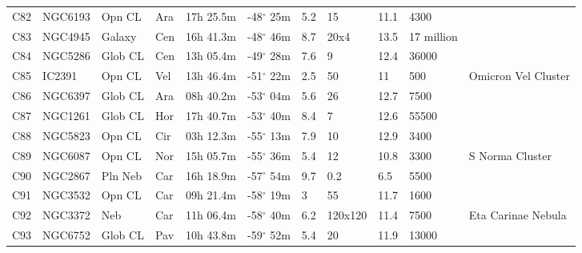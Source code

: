 \documentclass[10pt,twoside,a4paper,english]{article}
\begin{document}
\begin{longtable}{@{}lllllllllll@{}}
C82        & NGC6193     & Opn CL     & Ara       & 17h 25.5m & -48$^{\circ}$ 25m  & 5.2       & 15                   & 11.1     & 4300                &                                 \\ 
C83        & NGC4945     & Galaxy     & Cen       & 16h 41.3m & -48$^{\circ}$ 46m  & 8.7       & 20x4                 & 13.5     & 17 million          &                                 \\ 
C84        & NGC5286     & Glob CL    & Cen       & 13h 05.4m & -49$^{\circ}$ 28m  & 7.6       & 9                    & 12.4     & 36000               &                                 \\ 
C85        & IC2391      & Opn CL     & Vel       & 13h 46.4m & -51$^{\circ}$ 22m  & 2.5       & 50                   & 11       & 500                 & Omicron Vel Cluster             \\ 
C86        & NGC6397     & Glob CL    & Ara       & 08h 40.2m & -53$^{\circ}$ 04m  & 5.6       & 26                   & 12.7     & 7500                &                                 \\ 
C87        & NGC1261     & Glob CL    & Hor       & 17h 40.7m & -53$^{\circ}$ 40m  & 8.4       & 7                    & 12.6     & 55500               &                                 \\ 
C88        & NGC5823     & Opn CL     & Cir       & 03h 12.3m & -55$^{\circ}$ 13m  & 7.9       & 10                   & 12.9     & 3400                &                                 \\ 
C89        & NGC6087     & Opn CL     & Nor       & 15h 05.7m & -55$^{\circ}$ 36m  & 5.4       & 12                   & 10.8     & 3300                & S Norma Cluster                 \\ 
C90        & NGC2867     & Pln Neb    & Car       & 16h 18.9m & -57$^{\circ}$ 54m  & 9.7       & 0.2                  & 6.5      & 5500                &                                 \\ 
C91        & NGC3532     & Opn CL     & Car       & 09h 21.4m & -58$^{\circ}$ 19m  & 3         & 55                   & 11.7     & 1600                &                                 \\ 
C92        & NGC3372     & Neb        & Car       & 11h 06.4m & -58$^{\circ}$ 40m  & 6.2       & 120x120              & 11.4     & 7500                & Eta Carinae Nebula              \\ 
C93        & NGC6752     & Glob CL    & Pav       & 10h 43.8m & -59$^{\circ}$ 52m  & 5.4       & 20                   & 11.9     & 13000               &                                 \\ 

\end{longtable}
\end{document}
